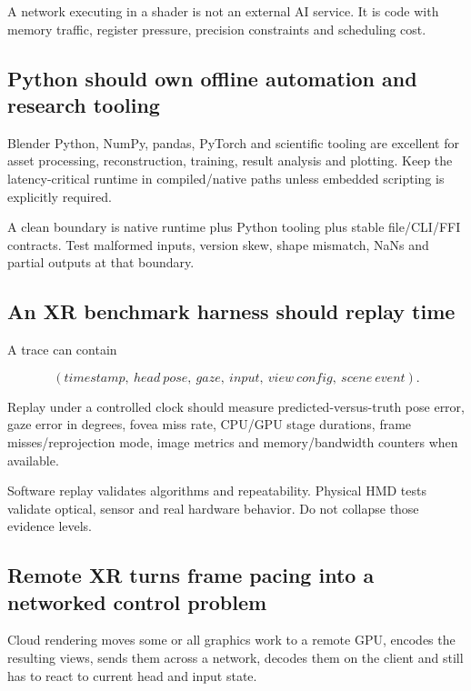 A network executing in a shader is not an external AI service. It is code with memory traffic, register pressure, precision constraints and scheduling cost.

\subsection{Python should own offline automation and research tooling}\label{python-should-own-offline-automation-and-research-tooling}

Blender Python, NumPy, pandas, PyTorch and scientific tooling are excellent for asset processing, reconstruction, training, result analysis and plotting. Keep the latency-critical runtime in compiled/native paths unless embedded scripting is explicitly required.

A clean boundary is native runtime plus Python tooling plus stable file/CLI/FFI contracts. Test malformed inputs, version skew, shape mismatch, NaNs and partial outputs at that boundary.

\subsection{An XR benchmark harness should replay time}\label{an-xr-benchmark-harness-should-replay-time}

A trace can contain

\[
(timestamp,\ head\ pose,\ gaze,\ input,\ view\ config,\ scene\ event).
\]

Replay under a controlled clock should measure predicted-versus-truth pose error, gaze error in degrees, fovea miss rate, CPU/GPU stage durations, frame misses/reprojection mode, image metrics and memory/bandwidth counters when available.

Software replay validates algorithms and repeatability. Physical HMD tests validate optical, sensor and real hardware behavior. Do not collapse those evidence levels.

\subsection{Remote XR turns frame pacing into a networked control problem}\label{remote-xr-turns-frame-pacing-into-a-networked-control-problem}

Cloud rendering moves some or all graphics work to a remote GPU, encodes the resulting views, sends them across a network, decodes them on the client and still has to react to current head and input state.

